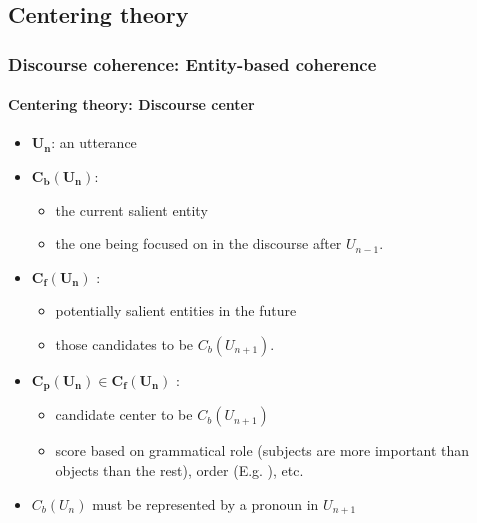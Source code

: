 \documentclass[xcolor=table]{beamer}
\begin{document}
\subsection{Centering theory}

\begin{frame}
	\frametitle{Discourse coherence: Entity-based coherence}
	\framesubtitle{Centering theory: Discourse center}
	
	\begin{itemize}
		\item $\mathbf{U_n}$: an utterance
		\item $\mathbf{C_b(U_n)}$: 
		\begin{itemize}
			\item the current salient entity
			\item the one being focused on in the discourse after $ U_{n-1} $.
		\end{itemize}
		\item $\mathbf{C_f(U_n)}$ : 
		\begin{itemize}
			\item potentially salient entities in the future
			\item those candidates to be $C_b(U_{n+1})$.
		\end{itemize}
		\item $\mathbf{C_p(U_n) \in C_f(U_n)}$ : 
		\begin{itemize}
			\item candidate center to be $C_b(U_{n+1})$
			\item score based on grammatical role (subjects are more important than objects than the rest), order (E.g. ), etc.
		\end{itemize}
		\item $C_b(U_n)$ must be represented by a pronoun in $U_{n+1}$
	\end{itemize}
	
\end{frame}
\end{document}

